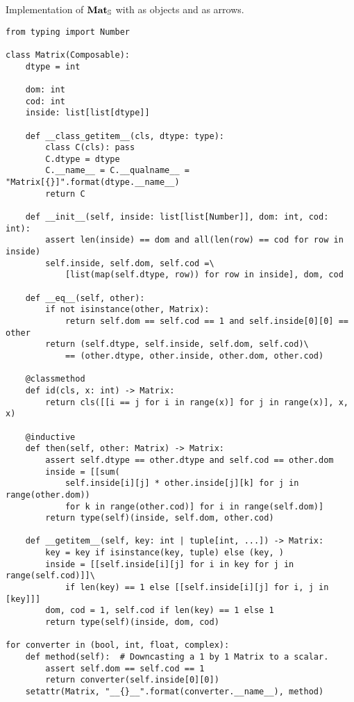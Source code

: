 \begin{python}\label{listing:matrix}
{\normalfont Implementation of $\mathbf{Mat}_\S$ with  as objects and  as arrows.}

\begin{verbatim}
from typing import Number

class Matrix(Composable):
    dtype = int

    dom: int
    cod: int
    inside: list[list[dtype]]

    def __class_getitem__(cls, dtype: type):
        class C(cls): pass
        C.dtype = dtype
        C.__name__ = C.__qualname__ = "Matrix[{}]".format(dtype.__name__)
        return C

    def __init__(self, inside: list[list[Number]], dom: int, cod: int):
        assert len(inside) == dom and all(len(row) == cod for row in inside)
        self.inside, self.dom, self.cod =\
            [list(map(self.dtype, row)) for row in inside], dom, cod

    def __eq__(self, other):
        if not isinstance(other, Matrix):
            return self.dom == self.cod == 1 and self.inside[0][0] == other
        return (self.dtype, self.inside, self.dom, self.cod)\
            == (other.dtype, other.inside, other.dom, other.cod)

    @classmethod
    def id(cls, x: int) -> Matrix:
        return cls([[i == j for i in range(x)] for j in range(x)], x, x)

    @inductive
    def then(self, other: Matrix) -> Matrix:
        assert self.dtype == other.dtype and self.cod == other.dom
        inside = [[sum(
            self.inside[i][j] * other.inside[j][k] for j in range(other.dom))
            for k in range(other.cod)] for i in range(self.dom)]
        return type(self)(inside, self.dom, other.cod)

    def __getitem__(self, key: int | tuple[int, ...]) -> Matrix:
        key = key if isinstance(key, tuple) else (key, )
        inside = [[self.inside[i][j] for i in key for j in range(self.cod)]]\
            if len(key) == 1 else [[self.inside[i][j] for i, j in [key]]]
        dom, cod = 1, self.cod if len(key) == 1 else 1
        return type(self)(inside, dom, cod)

for converter in (bool, int, float, complex):
    def method(self):  # Downcasting a 1 by 1 Matrix to a scalar.
        assert self.dom == self.cod == 1
        return converter(self.inside[0][0])
    setattr(Matrix, "__{}__".format(converter.__name__), method)
\end{verbatim}


\end{python}
